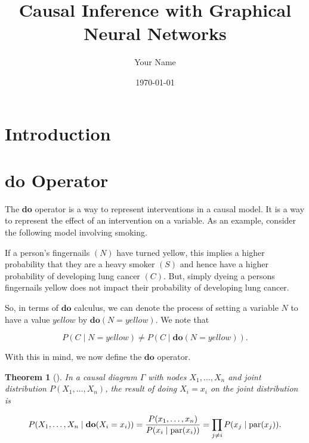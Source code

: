 \documentclass{article}
\newtheorem{theorem}{Theorem}[section]
\begin{document}
\title{Causal Inference with Graphical Neural Networks}
\author{Your Name}
\date{\today}
\maketitle

\section{Introduction}



\section{$\textbf{do}$ Operator}

The \textbf{do} operator is a way to represent interventions in a causal model. 
It is a way to represent the effect of an intervention on a variable. As an example, 
consider the following model involving smoking.

If a person's fingernails $(N)$ have turned yellow, this implies a higher probability 
that they are a heavy smoker $(S)$ and hence have a higher probability of developing 
lung cancer $(C)$. But, simply dyeing a persons fingernails yellow does not impact 
their probability of developing lung cancer. 

So, in terms of $\textbf{do}$ calculus, we can denote the process of setting a 
variable $N$ to have a value $\textit{yellow}$ by $\textbf{do}(N = \textit{yellow})$. 
We note that 

\begin{equation*}
P(C \;|\;N = \textit{yellow}) \neq P(C\;|\; \textbf{do}(N=\textit{yellow})).
\end{equation*}

With this in mind, we now define the $\textbf{do}$ operator.

\begin{theorem}[{{\cite{pearl2009causal}}}]
    In a causal diagram $\Gamma$ with nodes $X_1,\dots, X_n$ and joint distribution 
    $P(X_1, \dots, X_n)$, the result of doing $X_i = x_i$ on the joint distribution is

    \[
        P(X_1, \dots, X_n \;|\; \textbf{do}(X_i = x_i)) = \frac{P(x_1,\dots,x_n)}{P(x_i\;|\; \textup{par}(x_i))} = \prod_{j\neq i}P(x_j\;|\; \textup{par}(x_j)).
    \]
\end{theorem}
\end{document}
